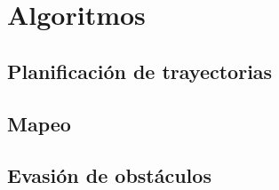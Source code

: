 \documentclass[sigconf]{acmart}
\begin{document}









\section{Algoritmos}

\subsection*{Planificación de trayectorias}

\subsection*{Mapeo}

\subsection*{Evasión de obstáculos}
\end{document}
